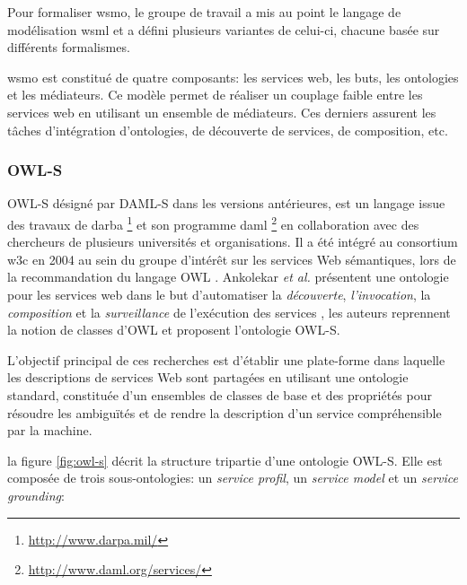     Pour formaliser \acrshort{wsmo}, le groupe de travail a mis au point
    le langage de modélisation \acrshort{wsml} \cite{de2006web} et a
    défini plusieurs variantes de celui-ci, chacune basée sur différents
    formalismes.\medskip

    \acrshort{wsmo} est constitué de quatre composants: les services
    web, les buts, les ontologies et les médiateurs. Ce modèle permet
    de réaliser un couplage faible entre les services web en utilisant
    un ensemble de médiateurs. Ces derniers assurent les tâches
    d'intégration d'ontologies, de découverte de services, de
    composition, etc.

    \newpage
    \subsubsection{OWL-S}
    \label{sec:owl-s-1}
    \textsc{OWL-S} \cite{martin2004owl} désigné par \textsc{DAML-S}
    \cite{ankolekar2002daml} dans les versions antérieures, est un
    langage issue des travaux de \acrshort{darba}
    \footnote{\url{http://www.darpa.mil/}} et son programme
    \acrshort{daml} \footnote{\url{http://www.daml.org/services/}} en
    collaboration avec des chercheurs de plusieurs universités et
    organisations. Il a été intégré au consortium \acrshort{w3c} en
    2004 au sein du groupe d'intérêt sur les services Web sémantiques,
    lors de la recommandation du langage \textsc{OWL}
    \cite{horrocks2002daml+oil, mcguinness2004owl}. Ankolekar \emph{et
      al.}  \cite{ankolekar2002daml} présentent une ontologie pour les
    services web dans le but d'automatiser la \emph{découverte},
    \emph{l'invocation}, la \emph{composition} et la
    \emph{surveillance} de l'exécution des services
    \cite{mcilraith2003bringing}, les auteurs reprennent la notion de
    classes d'\textsc{OWL} et proposent l'ontologie
    \textsc{OWL-S}.\bigskip

    

    L'objectif principal de ces recherches est d'établir une
    plate-forme dans laquelle les descriptions de services Web sont
    partagées en utilisant une ontologie standard, constituée d'un
    ensembles de classes de base et des propriétés pour résoudre les
    ambiguïtés et de rendre la description d'un service compréhensible
    par la machine.\bigskip

    la figure \ref{fig:owl-s} décrit la structure tripartie d'une
    ontologie \textsc{OWL-S}. Elle est composée de trois
    sous-ontologies: un \emph{service profil}, un \emph{service
      model} et un \emph{service grounding}:


